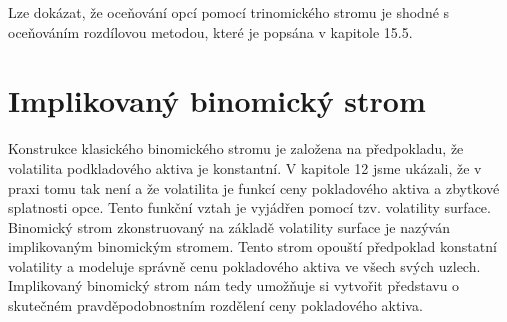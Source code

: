 \documentclass[a4paper]{book}
\begin{document}
Lze dokázat, že oceňování opcí pomocí trinomického stromu je shodné s oceňováním rozdílovou metodou, které je popsána v kapitole 15.5.

\section{Implikovaný binomický strom}

Konstrukce klasického binomického stromu je založena na předpokladu, že volatilita podkladového aktiva je konstantní. V kapitole 12 jsme ukázali, že v praxi tomu tak není a že volatilita je funkcí ceny pokladového aktiva a zbytkové splatnosti opce. Tento funkční vztah je vyjádřen pomocí tzv. volatility surface. Binomický strom zkonstruovaný na základě volatility surface je nazýván implikovaným binomickým stromem. Tento strom opouští předpoklad konstatní volatility a modeluje správně cenu pokladového aktiva ve všech svých uzlech. Implikovaný binomický strom nám tedy umožňuje si vytvořit představu o skutečném pravděpodobnostním rozdělení ceny pokladového aktiva.
\end{document}
